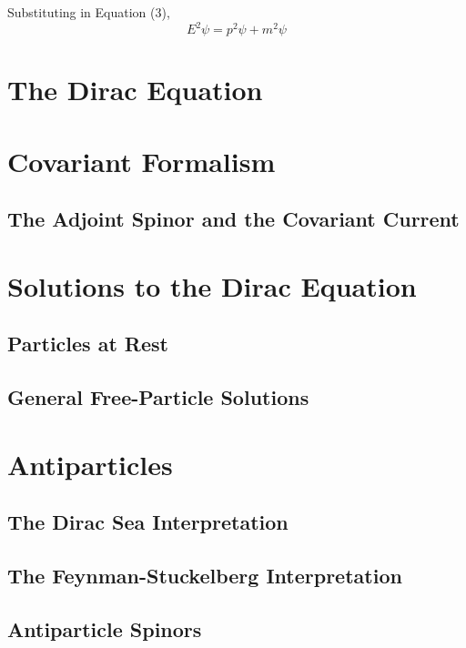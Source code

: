 Substituting in Equation (3),
\begin{equation*}
	E^2\psi=p^2\psi+m^2\psi
\end{equation*}
\section{The Dirac Equation}
\section{Covariant Formalism}
\subsection{The Adjoint Spinor and the Covariant Current}
\section{Solutions to the Dirac Equation}
\subsection{Particles at Rest}
\subsection{General Free-Particle Solutions}
\section{Antiparticles}
\subsection{The Dirac Sea Interpretation}
\subsection{The Feynman-Stuckelberg Interpretation}
\subsection{Antiparticle Spinors}